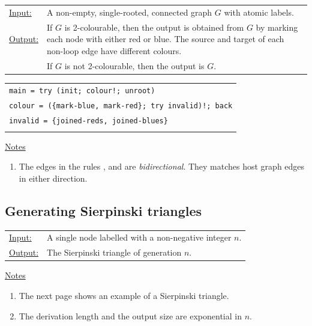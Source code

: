 \begin{tabular}{lp{10.5cm}}
\ul{Input:} & A non-empty, single-rooted, connected graph $G$ with atomic labels. \\
\ul{Output:} & If $G$\/ is 2-colourable, then the output is obtained from $G$\/ by marking each node with either red or blue. The source and target of each non-loop edge have different colours.\\
& If $G$\/ is not 2-colourable, then the output is $G$.
\end{tabular}

\vspace{10pt}
\begin{tabular}{|l|}
\hline
\hspace{2pt} \texttt{main = try (init; colour!; unroot)} \\
\hspace{2pt} \texttt{colour = (\{mark-blue, mark-red\}; try invalid)!; back} \\
\hspace{2pt} \texttt{invalid = \{joined-reds, joined-blues\}} \\
 \\
\hline
\end{tabular}
\vspace{10pt}

\ul{Notes}
\begin{enumerate}
\setlength{\itemsep}{-.5ex}
\item The edges in the rules ,  and  are \emph{bidirectional}. They matches host graph edges in either direction.
\end{enumerate}


\subsection{Generating Sierpinski triangles}

\begin{tabular}{lp{10.5cm}}
\ul{Input:} & A single node labelled with a non-negative integer $n$. \\
\ul{Output:} & The Sierpinski triangle of generation $n$.
\end{tabular}
  
\begin{center}

\end{center}

\ul{Notes}
\begin{enumerate}
\setlength{\itemsep}{-.5ex}
\item The next page shows an example of a Sierpinski triangle.
\item The derivation length and the output size are exponential in $n$.
\end{enumerate}


